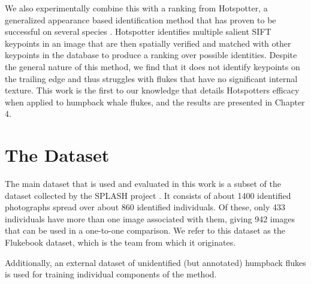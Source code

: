 

We also experimentally combine this with a ranking from Hotspotter, a generalized appearance based identification method that has proven to be successful on several species \cite{crall_hotspotter_2013}.
Hotspotter identifies multiple salient SIFT keypoints in an image that are then spatially verified and matched with other keypoints in the database to produce a ranking over possible identities. %
Despite the general nature of this method, we find that it does not identify keypoints on the trailing edge and thus struggles with flukes that have no significant internal texture. 
This work is the first to our knowledge that details Hotspotters efficacy when applied to humpback whale flukes, and the results are presented in Chapter 4.

\section{The Dataset}

The main dataset that is used and evaluated in this work is a subset of the dataset collected by the SPLASH project \cite{calambokidis2008splash}. 
It consists of about 1400 identified photographs spread over about 860 identified individuals.
Of these, only 433 individuals have more than one image associated with them, giving 942 images that can be used in a one-to-one comparison.
We refer to this dataset as the Flukebook dataset, which is the team from which it originates. %

Additionally, an external dataset of unidentified (but annotated) humpback flukes is used for training individual components of the method.


